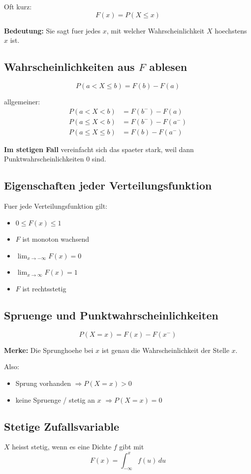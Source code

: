 \documentclass[a4paper,11pt]{article}
\begin{document}
Oft kurz:
\[
F(x)=P(X\le x)
\]

\textbf{Bedeutung:}
Sie sagt fuer jedes $x$, mit welcher Wahrscheinlichkeit $X$ hoechstens $x$ ist.

\subsection{Wahrscheinlichkeiten aus $F$ ablesen}
\[
P(a<X\le b)=F(b)-F(a)
\]

allgemeiner:
\begin{align*}
P(a<X<b) &= F(b^-)-F(a) \\
P(a\le X<b) &= F(b^-)-F(a^-) \\
P(a\le X\le b) &= F(b)-F(a^-)
\end{align*}

\textbf{Im stetigen Fall} vereinfacht sich das spaeter stark, weil dann Punktwahrscheinlichkeiten $0$ sind.

\subsection{Eigenschaften jeder Verteilungsfunktion}
Fuer jede Verteilungsfunktion gilt:
\begin{itemize}
  \item $0\le F(x)\le 1$
  \item $F$ ist monoton wachsend
  \item $\lim_{x\to -\infty}F(x)=0$
  \item $\lim_{x\to \infty}F(x)=1$
  \item $F$ ist rechtsstetig
\end{itemize}

\subsection{Spruenge und Punktwahrscheinlichkeiten}
\[
P(X=x)=F(x)-F(x^-)
\]

\textbf{Merke:}
Die Sprunghoehe bei $x$ ist genau die Wahrscheinlichkeit der Stelle $x$.

Also:
\begin{itemize}
  \item Sprung vorhanden $\Rightarrow P(X=x)>0$
  \item keine Spruenge / stetig an $x$ $\Rightarrow P(X=x)=0$
\end{itemize}

\subsection{Stetige Zufallsvariable}
$X$ heisst stetig, wenn es eine Dichte $f$ gibt mit
\[
F(x)=\int_{-\infty}^x f(u)\,du
\]
\end{document}
